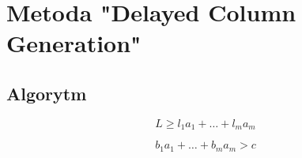 \newcommand{\mf}[1]{\textbf{\textit{#1}}}
\newcommand{\tsub}[1]{\textsubscript{#1}}
\newcommand{\tsuper}[1]{\textsuperscript{#1}}

\section{Metoda "Delayed Column Generation"}

\subsection{Algorytm}

\begin{equation}\label{length_eq}
L \ge l_1a_1+\dots+l_ma_m
\end{equation}

\begin{equation}\label{cost_eq}
b_1a_1+\dots+b_ma_m > c
\end{equation}

